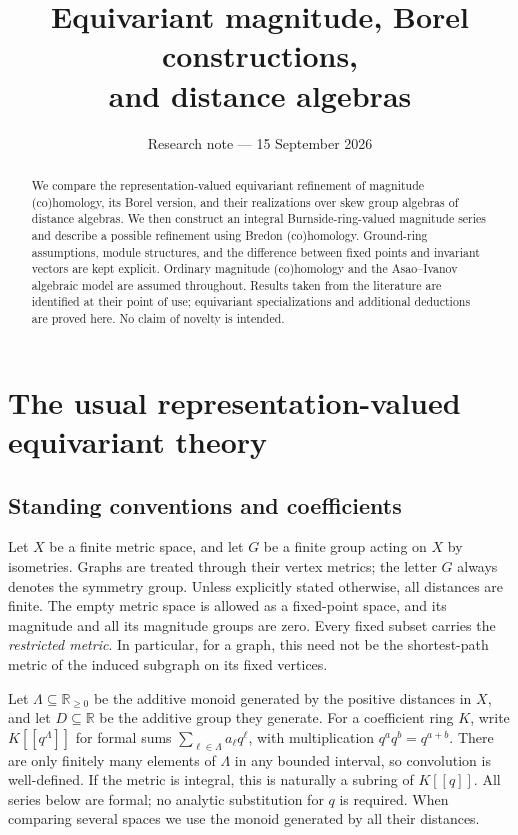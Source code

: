 \documentclass[11pt,a4paper]{article}
\title{Equivariant magnitude, Borel constructions,\texorpdfstring{\\}{ }and distance algebras}
\author{}
\date{Research note --- 15 September 2026}
\newcommand{\defn}[1]{\textsl{\color{darkblue} #1}}
\numberwithin{equation}{section}
\theoremstyle{definition}
\theoremstyle{remark}
\newcommand{\G}{G}
\begin{document}
\maketitle
\begin{abstract}
We compare the representation-valued equivariant refinement of magnitude
(co)homology, its Borel version, and their realizations over skew group
algebras of distance algebras.  We then construct an integral
Burnside-ring-valued magnitude series and describe a possible refinement
using Bredon (co)homology.  Ground-ring assumptions, module structures,
and the difference between fixed points and invariant vectors are kept
explicit.  Ordinary magnitude (co)homology and the Asao--Ivanov algebraic
model are assumed throughout.  Results taken from the literature are
identified at their point of use; equivariant specializations and
additional deductions are proved here.  No claim of novelty is intended.
\end{abstract}
\tableofcontents

\section{The usual representation-valued equivariant theory}
\label{sec:ordinary}

\subsection{Standing conventions and coefficients}

Let $X$ be a finite metric space, and let $\G$ be a finite group acting
on $X$ by isometries.  Graphs are treated through their vertex metrics;
the letter $\G$ always denotes the symmetry group.  Unless explicitly
stated otherwise, all distances are finite.  The empty metric space is
allowed as a fixed-point space, and its magnitude and all its magnitude
groups are zero.  Every fixed subset carries the \defn{restricted metric}.
In particular, for a graph, this need not be the shortest-path metric of
the induced subgraph on its fixed vertices.

Let $\Lambda\subseteq\mathbb R_{\geq0}$ be the additive monoid generated
by the positive distances in $X$, and let $D\subseteq\mathbb R$ be the
additive group they generate.  For a coefficient ring $K$, write
$K[[q^\Lambda]]$ for formal sums $\sum_{\ell\in\Lambda}a_\ell q^\ell$,
with multiplication $q^a q^b=q^{a+b}$.  There are only finitely many
elements of $\Lambda$ in any bounded interval, so convolution is
well-defined.  If the metric is integral, this is naturally a subring
of $K[[q]]$.  All series below are formal; no analytic substitution for
$q$ is required.  When comparing several spaces we use the monoid
generated by all their distances.
\end{document}
